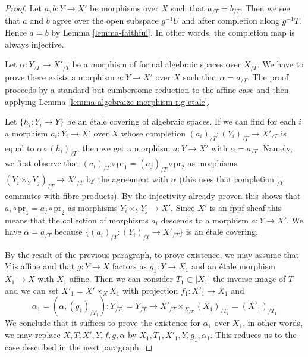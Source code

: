 \documentclass[10pt,a4paper]{amsart}
\theoremstyle{plain}
\theoremstyle{definition}
\theoremstyle{remark}
\numberwithin{equation}{subsection}
\begin{document}
\begin{proof}
Let $a, b : Y \to X'$ be morphisms over $X$ such that
$a_{/T} = b_{/T}$. Then we see that $a$ and $b$ agree over the open
subspace $g^{-1}U$ and after completion along $g^{-1}T$.
Hence $a = b$ by Lemma \ref{lemma-faithful}.
In other words, the completion map is always injective.

\medskip\noindent
Let $\alpha : Y_{/T} \to X'_{/T}$ be a morphism of formal algebraic spaces
over $X_{/T}$. We have to prove there exists a morphism $a : Y \to X'$
over $X$ such that $\alpha = a_{/T}$. The proof proceeds by a standard
but cumbersome reduction to the affine case and then applying
Lemma \ref{lemma-algebraize-morphism-rig-etale}.

\medskip\noindent
Let $\{h_i : Y_i \to Y\}$ be an \'etale covering of algebraic spaces.
If we can find for each $i$ a morphism $a_i : Y_i \to X'$ over $X$
whose completion $(a_i)_{/T} : (Y_i)_{/T} \to X'_{/T}$ is equal to
$\alpha \circ (h_i)_{/T}$, then we get a morphism $a : Y \to X'$
with $\alpha = a_{/T}$. Namely, we first observe that
$(a_i)_{/T} \circ \text{pr}_1 = (a_j)_{/T} \circ \text{pr}_2$
as morphisms $(Y_i \times_Y Y_j)_{/T} \to X'_{/T}$ by the
agreement with $\alpha$ (this uses that completion ${}_{/T}$ commutes
with fibre products). By the injectivity already proven this shows that
$a_i \circ \text{pr}_1 = a_j \circ \text{pr}_2$ as morphisms
$Y_i \times_Y Y_j \to X'$. Since $X'$ is an fppf sheaf this means that
the collection of morphisms $a_i$ descends to a morphism $a : Y \to X'$.
We have $\alpha = a_{/T}$ because $\{(a_i)_{/T} : (Y_i)_{/T} \to X'_{/T}\}$
is an \'etale covering.

\medskip\noindent
By the result of the previous paragraph, to prove existence,
we may assume that $Y$ is affine and that $g : Y \to X$ factors
as $g_1 : Y \to X_1$ and an \'etale morphism $X_1 \to X$ with $X_1$ affine.
Then we can consider $T_1 \subset |X_1|$ the inverse image of $T$
and we can set $X'_1 = X' \times_X X_1$ with projection $f_1 : X'_1 \to X_1$
and
$$
\alpha_1 = (\alpha, (g_1)_{/T_1}) :
Y_{/T_1} = Y_{/T}
\longrightarrow
X'_{/T} \times_{X_{/T}} (X_1)_{/T_1} = (X'_1)_{/T_1}
$$
We conclude that it suffices to prove the existence for $\alpha_1$
over $X_1$, in other words, we may replace $X, T, X', Y, f, g, \alpha$
by $X_1, T_1, X'_1, Y, g_1, \alpha_1$.
This reduces us to the case described in the next paragraph.


\end{proof}
\end{document}
